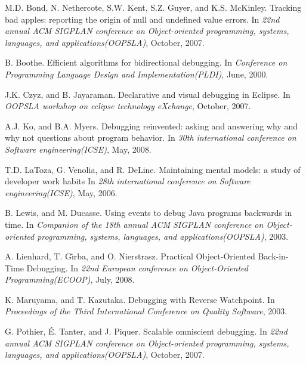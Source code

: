 \documentclass[preprint]{sigplanconf}
\begin{document}
\begin{thebibliography}{10}
\softraggedright

M.D. Bond, N. Nethercote, S.W. Kent, S.Z. Guyer, and K.S. McKinley. \newblock Tracking bad apples: reporting the origin of null and undefined value errors.
\newblock In \emph{22nd annual ACM SIGPLAN conference on Object-oriented programming, systems, languages, and applications(OOPSLA)},
October, 2007.

B. Boothe. \newblock Efficient algorithms for bidirectional debugging.
\newblock In \emph{Conference on Programming Language Design and Implementation(PLDI)},
June, 2000.

J.K. Czyz, and B. Jayaraman. \newblock Declarative and visual debugging in Eclipse.
\newblock In \emph{OOPSLA workshop on eclipse technology eXchange},
October, 2007.

A.J. Ko, and B.A. Myers. \newblock Debugging reinvented: asking and answering why and why not questions about program behavior.
\newblock In \emph{30th international conference on Software engineering(ICSE)},
May, 2008.

T.D. LaToza, G. Venolia, and R. DeLine. \newblock Maintaining mental models: a study of developer work habits
\newblock In \emph{28th international conference on Software engineering(ICSE)},
May, 2006.

B. Lewis, and M. Ducasse. \newblock Using events to debug Java programs backwards in time.
\newblock In \emph{Companion of the 18th annual ACM SIGPLAN conference on Object-oriented programming, systems, languages, and applications(OOPSLA)},
2003.

A. Lienhard, T. G\^{\i}rba, and O. Nierstrasz. \newblock Practical Object-Oriented Back-in-Time Debugging.
\newblock In \emph{22nd European conference on Object-Oriented Programming(ECOOP)},
July, 2008.

K. Maruyama, and T. Kazutaka. \newblock Debugging with Reverse Watchpoint.
\newblock In \emph{Proceedings of the Third International Conference on Quality Software},
2003.

G. Pothier, \'{E}. Tanter, and J. Piquer. \newblock Scalable omniscient debugging.
\newblock In \emph{22nd annual ACM SIGPLAN conference on Object-oriented programming, systems, languages, and applications(OOPSLA)},
October, 2007.


\end{thebibliography}
\end{document}
